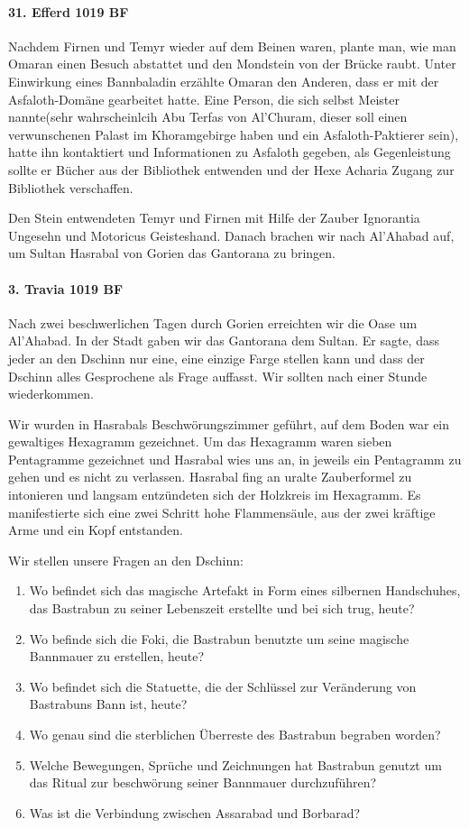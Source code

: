 \paragraph{31. Efferd 1019 BF}
Nachdem Firnen und Temyr wieder auf dem Beinen waren, plante man, wie man Omaran einen Besuch abstattet und den Mondstein von der Brücke raubt. Unter Einwirkung eines Bannbaladin erzählte Omaran den Anderen, dass er mit der Asfaloth-Domäne gearbeitet hatte. Eine Person, die sich selbst Meister nannte(sehr wahrscheinlcih Abu Terfas von Al'Churam, dieser soll einen verwunschenen Palast im Khoramgebirge haben und ein Asfaloth-Paktierer sein), hatte ihn kontaktiert und Informationen zu Asfaloth gegeben, als Gegenleistung sollte er Bücher aus der Bibliothek entwenden und der Hexe Acharia Zugang zur Bibliothek verschaffen.

Den Stein entwendeten Temyr und Firnen mit Hilfe der Zauber Ignorantia Ungesehn und Motoricus Geisteshand. Danach brachen wir nach Al'Ahabad auf, um Sultan Hasrabal von Gorien das Gantorana zu bringen.

\paragraph{3. Travia 1019 BF}
Nach zwei beschwerlichen Tagen durch Gorien erreichten wir die Oase um Al'Ahabad. In der Stadt gaben wir das Gantorana dem Sultan. Er sagte, dass jeder an den Dschinn nur eine, eine einzige Farge stellen kann und dass der Dschinn alles Gesprochene als Frage auffasst. Wir sollten nach einer Stunde wiederkommen.

Wir wurden in Hasrabals Beschwörungszimmer geführt, auf dem Boden war ein gewaltiges Hexagramm gezeichnet. Um das Hexagramm waren sieben Pentagramme gezeichnet und Hasrabal wies uns an, in jeweils ein Pentagramm zu gehen und es nicht zu verlassen. Hasrabal fing an uralte Zauberformel zu intonieren und langsam entzündeten sich der Holzkreis im Hexagramm. Es manifestierte sich eine zwei Schritt hohe Flammensäule, aus der zwei kräftige Arme und ein Kopf entstanden.

Wir stellen unsere Fragen an den Dschinn:
\begin{enumerate}
    \item Wo befindet sich das magische Artefakt in Form eines silbernen Handschuhes, das Bastrabun zu seiner Lebenszeit erstellte und bei sich trug, heute?
    \item Wo befinde sich die Foki, die Bastrabun benutzte um seine magische Bannmauer zu erstellen, heute?
    \item Wo befindet sich die Statuette, die der Schlüssel zur Veränderung von Bastrabuns Bann ist, heute?
    \item Wo genau sind die sterblichen Überreste des Bastrabun begraben worden?
    \item Welche Bewegungen, Sprüche und Zeichnungen hat Bastrabun genutzt um das Ritual zur beschwörung seiner Bannmauer durchzuführen?
    \item Was ist die Verbindung zwischen Assarabad und Borbarad?
\end{enumerate}

